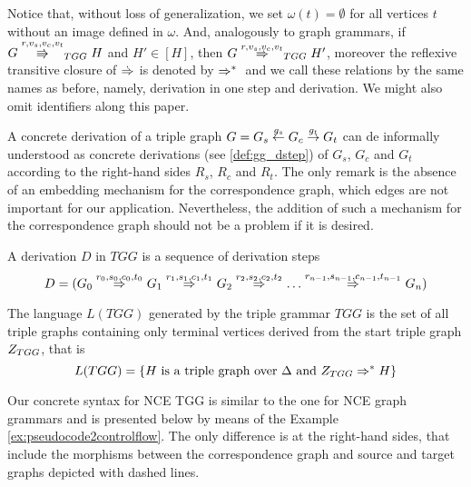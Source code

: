 \documentclass[runningheads]{llncs}
\begin{document}
Notice that, without loss of generalization, we set $\omega(t) = \emptyset$ for all vertices $t$ without an image defined in $\omega$. And, analogously to graph grammars, if $G \cderiv{r}{v_s,v_c,v_t}{TGG} H$ and $H' \in [H]$, then $G \tderiv{r}{v_s,v_c,v_t}{TGG} H'$, moreover the reflexive transitive closure of $\tderiv{}{}{}$ is denoted by $\Rightarrow^*_{}{}{}$ and we call these relations by the same names as before, namely, derivation in one step and derivation. We might also omit identifiers along this paper.

A concrete derivation of a triple graph $G = G_s \overset{g_s}{\leftarrow} G_c \overset{g_t}{\rightarrow} G_t$ can de informally understood as concrete derivations (see \ref{def:gg_dstep}) of $G_s$, $G_c$ and $G_t$ according to the right-hand sides $R_s$, $R_c$ and $R_t$. The only remark is the absence of an embedding mechanism for the correspondence graph, which edges are not important for our application. Nevertheless, the addition of such a mechanism for the correspondence graph should not be a problem if it is desired.

\begin{definition}
	A derivation $D$ in $TGG$ is a sequence of derivation steps
	\begin{equation*}
		D = (G_0 \tderiv{r_0}{s_0,c_0,t_0}{} G_1 \tderiv{r_1}{s_1,c_1,t_1}{} G_2 \tderiv{r_2}{s_2,c_2,t_2}{} \dots \tderiv{r_{n-1}}{s_{n-1},c_{n-1},t_{n-1}}{} G_n)
	\end{equation*}
\end{definition}

\begin{definition}
	\label{def:tlanguage}
	The language $L(TGG)$ generated by the triple grammar $TGG$ is the set of all triple graphs containing only terminal vertices derived from the start triple graph $Z_{TGG}$, that is
	\begin{equation*}
		L(TGG) = \{H \text{ is a triple graph over } \Delta \text{ and } Z_{TGG} \Rightarrow^*_{}{}{} H\}
	\end{equation*}
\end{definition}

Our concrete syntax for NCE TGG is similar to the one for NCE graph grammars and is presented below by means of the Example \ref{ex:pseudocode2controlflow}. The only difference is at the right-hand sides, that include the morphisms between the correspondence graph and source and target graphs depicted with dashed lines.
\end{document}
